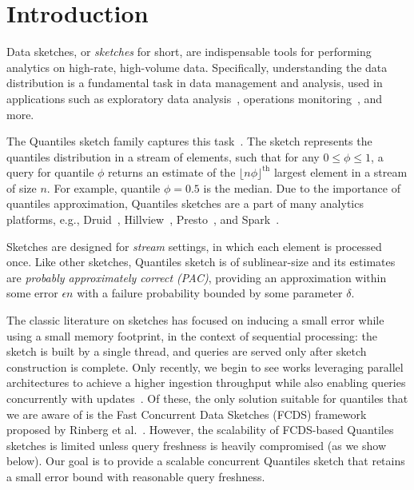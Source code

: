 \chapter{Introduction}
\label{chap:intro}

Data sketches, or \emph{sketches} for short, are indispensable tools for performing analytics on high-rate, high-volume data. Specifically, understanding the data distribution is a fundamental task in data management and analysis, used in applications such as exploratory data analysis~\cite{vartak2015seedb}, operations monitoring~\cite{abraham2013scuba}, and more. 

The Quantiles sketch family captures this task~\cite{masson2019ddsketch, mergeables_summaries, gan2018moment, cormode2021relative}. The sketch represents the quantiles distribution in a stream of elements, such that for any $0 \leq \phi \leq 1$, a query for quantile $\phi$ returns an estimate of the $\lfloor n\phi \rfloor ^{\text{th}}$ largest element in a stream of size $n$. For example, quantile $\phi=0.5$ is the median. Due to the importance of quantiles approximation, Quantiles sketches are a part of many analytics platforms, e.g., Druid~\cite{druid-quantiles}, Hillview~\cite{budiu2019hillview}, Presto~\cite{presto}, and Spark~\cite{spark}. 

Sketches are designed for \emph{stream} settings, in which each element is processed once. Like other sketches, Quantiles sketch is of sublinear-size and its estimates are \emph{probably approximately correct (PAC)}, providing an approximation within some error $\epsilon n$ with a failure probability bounded by some parameter $\delta$. 

The classic literature on sketches has focused on inducing a small error while using a small memory footprint, in the context of sequential processing: the sketch is built by a single thread, and queries are served only after sketch construction is complete. Only recently, we begin to see works leveraging parallel architectures to achieve a higher ingestion throughput while also enabling queries concurrently with updates~\cite{Rinberg_2020_fast_sketches, stylianopoulos2020delegation}. 
Of these, the only solution suitable for quantiles that we are aware of is the Fast Concurrent Data Sketches (FCDS) framework proposed by Rinberg et al.~\cite{Rinberg_2020_fast_sketches}. However, the scalability of FCDS-based Quantiles sketches is limited unless query freshness is heavily compromised (as we show below). Our goal is to provide a scalable concurrent Quantiles sketch that retains a small error bound with reasonable query freshness.

